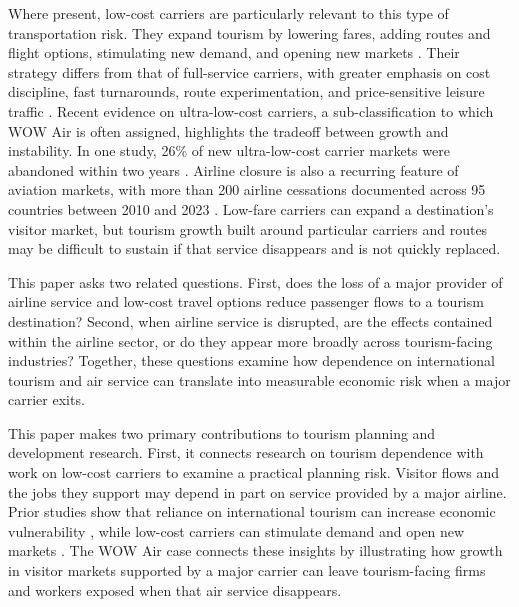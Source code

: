 \documentclass[12pt]{article}
\begin{document}
Where present, low-cost carriers are particularly relevant to this type of transportation risk. They expand tourism by lowering fares, adding routes and flight options, stimulating new demand, and opening new markets \citep{barrett_2004_airport,pulina_2010_have,chung_2011_korean,hongtsui_2017_does}. Their strategy differs from that of full-service carriers, with greater emphasis on cost discipline, fast turnarounds, route experimentation, and price-sensitive leisure traffic \citep{barrett_2004_airport,graham_2013_lcc_airport}. Recent evidence on ultra-low-cost carriers, a sub-classification to which WOW Air is often assigned, highlights the tradeoff between growth and instability. In one study, 26\% of new ultra-low-cost carrier markets were abandoned within two years \citep{bachwich_wittman_2017_ulcc}. Airline closure is also a recurring feature of aviation markets, with more than 200 airline cessations documented across 95 countries between 2010 and 2023 \citep{sun_zheng_wang_wandelt_2025_cessation}. Low-fare carriers can expand a destination's visitor market, but tourism growth built around particular carriers and routes may be difficult to sustain if that service disappears and is not quickly replaced.

This paper asks two related questions. First, does the loss of a major provider of airline service and low-cost travel options reduce passenger flows to a tourism destination? Second, when airline service is disrupted, are the effects contained within the airline sector, or do they appear more broadly across tourism-facing industries? Together, these questions examine how dependence on international tourism and air service can translate into measurable economic risk when a major carrier exits.

This paper makes two primary contributions to tourism planning and development research. First, it connects research on tourism dependence with work on low-cost carriers to examine a practical planning risk. Visitor flows and the jobs they support may depend in part on service provided by a major airline. Prior studies show that reliance on international tourism can increase economic vulnerability \citep{nguyen_2021_the,canh_2020_domestic,wang_2022_international}, while low-cost carriers can stimulate demand and open new markets \citep{pulina_2010_have,chung_2011_korean,hongtsui_2017_does,santos_2018_brussels}. The WOW Air case connects these insights by illustrating how growth in visitor markets supported by a major carrier can leave tourism-facing firms and workers exposed when that air service disappears.
\end{document}
